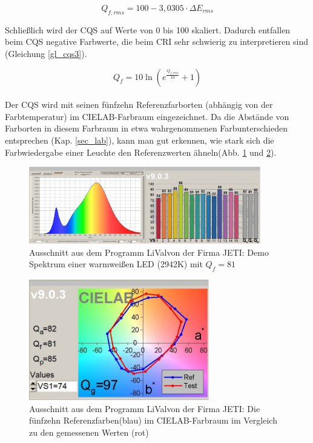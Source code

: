 \begin{equation}\label{gl_cqs2}
		Q_{f,rms} = 100 - 3,0305 \cdot \Delta E_{rms} 
\end{equation}

Schließlich wird der CQS auf Werte von 0 bis 100 skaliert. Dadurch entfallen beim CQS negative Farbwerte, die beim CRI sehr schwierig zu interpretieren sind (Gleichung \ref{gl_cqs3}). 

\begin{equation}\label{gl_cqs3}
		Q_{f} = 10 \ln(e^{\frac{Q_{f,rms}}{10}}+1) 
\end{equation}\\

Der CQS wird mit seinen fünfzehn Referenzfarborten (abhängig von der Farbtemperatur) im CIELAB-Farbraum eingezeichnet. Da die Abstände von Farborten in diesem Farbraum in etwa wahrgenommenen Farbunterschieden entsprechen (Kap. \ref{sec_lab}), kann man gut erkennen, wie stark sich die Farbwiedergabe einer Leuchte den Referenzwerten ähneln(Abb. \ref{b_cqs2a} und \ref{b_cqs2b}).\\

\begin{figure}[htp]     %
\centering
\includegraphics[width=0.9\textwidth]{bilder/cqs2a} 
\caption {Ausschnitt aus dem Programm \glqq LiVal\grqq von der Firma JETI: Demo Spektrum einer warmweißen LED (2942K) mit $Q_{f} = 81$}\label{b_cqs2a}
\end{figure}

\begin{figure}[htp]     %
\centering
\includegraphics[width=0.7\textwidth]{bilder/cqs2b} 
\caption {Ausschnitt aus dem Programm \glqq LiVal\grqq von der Firma JETI: Die fünfzehn Referenzfarben(blau) im CIELAB-Farbraum im Vergleich zu den gemessenen Werten (rot)}\label{b_cqs2b}
\end{figure}


